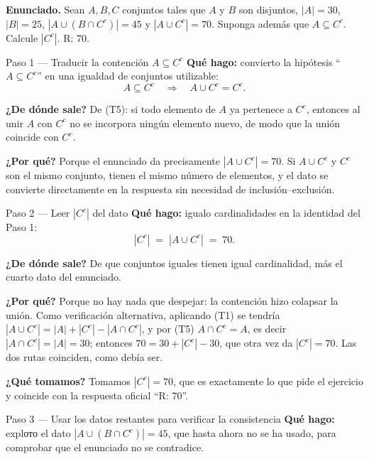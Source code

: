 \documentclass[11pt]{article}
\begin{document}
\textbf{Enunciado.} Sean $A, B, C$ conjuntos tales que $A$ y $B$ son disjuntos, $|A| = 30$, $|B| = 25$, $|A\cup (B\cap C^{c})| = 45$ y $|A\cup C^{c}| = 70$. Suponga además que $A\subseteq C^{c}$. Calcule $|C^{c}|$. R: 70.

\begin{sol}

\begin{paso}{Paso 1 --- Traducir la contención $A\subseteq C^{c}$}
\textbf{Qué hago:} convierto la hipótesis ``$A\subseteq C^{c}$'' en una igualdad de conjuntos utilizable:
\[
A\subseteq C^{c} \quad\Longrightarrow\quad A\cup C^{c} = C^{c}.
\]

\textbf{¿De dónde sale?} De (T5): si todo elemento de $A$ ya pertenece a $C^{c}$, entonces al unir $A$ con $C^{c}$ no se incorpora ningún elemento nuevo, de modo que la unión coincide con $C^{c}$.

\textbf{¿Por qué?} Porque el enunciado da precisamente $|A\cup C^{c}| = 70$. Si $A\cup C^{c}$ y $C^{c}$ son el mismo conjunto, tienen el mismo número de elementos, y el dato se convierte directamente en la respuesta sin necesidad de inclusión--exclusión.
\end{paso}

\begin{paso}{Paso 2 --- Leer $|C^{c}|$ del dato}
\textbf{Qué hago:} igualo cardinalidades en la identidad del Paso 1:
\[
|C^{c}| \;=\; |A\cup C^{c}| \;=\; 70 .
\]

\textbf{¿De dónde sale?} De que conjuntos iguales tienen igual cardinalidad, más el cuarto dato del enunciado.

\textbf{¿Por qué?} Porque no hay nada que despejar: la contención hizo colapsar la unión. Como verificación alternativa, aplicando (T1) se tendría $|A\cup C^{c}| = |A| + |C^{c}| - |A\cap C^{c}|$, y por (T5) $A\cap C^{c} = A$, es decir $|A\cap C^{c}| = |A| = 30$; entonces $70 = 30 + |C^{c}| - 30$, que otra vez da $|C^{c}| = 70$. Las dos rutas coinciden, como debía ser.

\textbf{¿Qué tomamos?} Tomamos $|C^{c}| = 70$, que es exactamente lo que pide el ejercicio y coincide con la respuesta oficial ``R: 70''.
\end{paso}

\begin{paso}{Paso 3 --- Usar los datos restantes para verificar la consistencia}
\textbf{Qué hago:} explото el dato $|A\cup(B\cap C^{c})| = 45$, que hasta ahora no se ha usado, para comprobar que el enunciado no se contradice.


\end{paso}
\end{sol}
\end{document}

